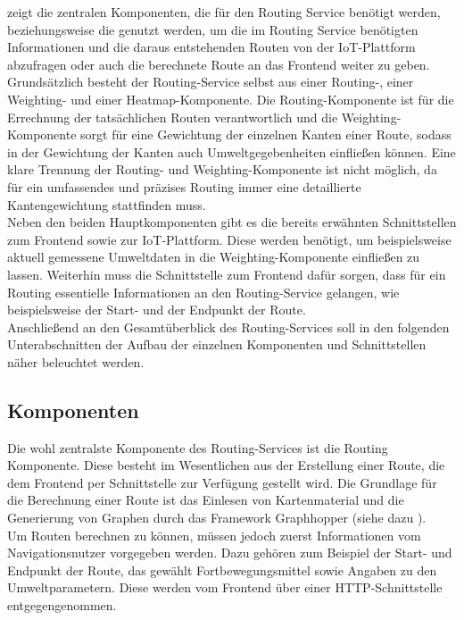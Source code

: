  zeigt die zentralen Komponenten, die für den Routing Service benötigt werden, beziehungsweise die genutzt werden, um die im Routing Service benötigten Informationen und die daraus entstehenden Routen von der IoT-Plattform abzufragen oder auch die berechnete Route an das Frontend weiter zu geben. \\
Grundsätzlich besteht der Routing-Service selbst aus einer Routing-, einer Weighting- und einer Heatmap-Komponente. Die Routing-Komponente ist für die Errechnung der tatsächlichen Routen verantwortlich und die Weighting-Komponente sorgt für eine Gewichtung der einzelnen Kanten einer Route, sodass in der Gewichtung der Kanten auch Umweltgegebenheiten einfließen können. Eine klare Trennung der Routing- und Weighting-Komponente ist nicht möglich, da für ein umfassendes und präzises Routing immer eine detaillierte Kantengewichtung stattfinden muss.\\
Neben den beiden Hauptkomponenten gibt es die bereits erwähnten Schnittstellen zum Frontend sowie zur IoT-Plattform. Diese werden benötigt, um beispielsweise aktuell gemessene Umweltdaten in die Weighting-Komponente einfließen zu lassen. Weiterhin muss die Schnittstelle zum Frontend dafür sorgen, dass für ein Routing essentielle Informationen an den Routing-Service gelangen, wie beispielsweise der Start- und der Endpunkt der Route.\\
Anschließend an den Gesamtüberblick des Routing-Services soll in den folgenden Unterabschnitten der Aufbau der einzelnen Komponenten und Schnittstellen näher beleuchtet werden.


\subsection{Komponenten}
Die wohl zentralste Komponente des Routing-Services ist die Routing Komponente. Diese besteht im Wesentlichen aus der Erstellung einer Route, die dem Frontend per Schnittstelle zur Verfügung gestellt wird. Die Grundlage für die Berechnung einer Route ist das Einlesen von Kartenmaterial und die Generierung von Graphen durch das Framework Graphhopper (siehe dazu ).\\  
Um Routen berechnen zu können, müssen jedoch zuerst Informationen vom Navigationsnutzer vorgegeben werden. Dazu gehören zum Beispiel der Start- und Endpunkt der Route, das gewählt Fortbewegungsmittel sowie Angaben zu den Umweltparametern. Diese werden vom Frontend über einer HTTP-Schnittstelle entgegengenommen. 

